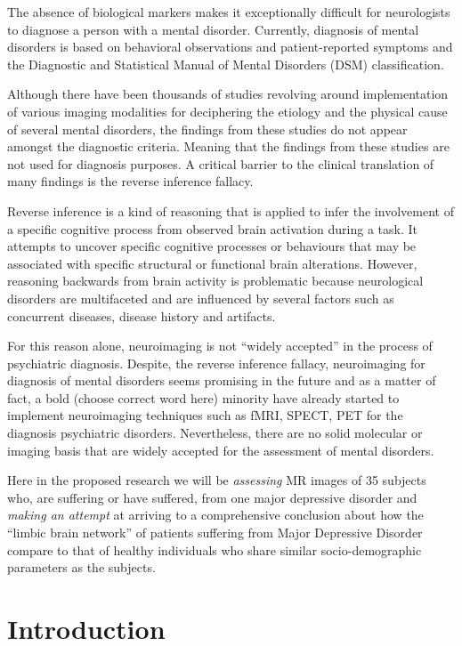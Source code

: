 \documentclass{article}
\begin{document}
  The absence of biological markers makes it exceptionally difficult
  for neurologists to diagnose a person with a mental disorder.
  Currently, diagnosis of mental disorders is based on behavioral
  observations and patient-reported symptoms and the Diagnostic and
  Statistical Manual of Mental Disorders (DSM) classification.

  Although there have been thousands of studies revolving around
  implementation of various imaging modalities for deciphering the
  etiology and the physical cause of several mental disorders, the
  findings from these studies do not appear amongst the diagnostic
  criteria. Meaning that the findings from these studies are not used
  for diagnosis purposes. A critical barrier to the clinical
  translation of many findings is the reverse inference fallacy.

  Reverse inference is a kind of reasoning that is applied to infer
  the involvement of a specific cognitive process from observed brain
  activation during a task.  It attempts to uncover specific cognitive
  processes or behaviours that may be associated with specific
  structural or functional brain alterations. However, reasoning
  backwards from brain activity is problematic because neurological
  disorders are multifaceted and are influenced by several factors
  such as concurrent diseases, disease history and artifacts.

  For this reason alone, neuroimaging is not ``widely accepted'' in
  the process of psychiatric diagnosis.  Despite, the reverse
  inference fallacy, neuroimaging for diagnosis of mental disorders
  seems promising in the future and as a matter of fact, a bold
  (choose correct word here) minority have already started to
  implement neuroimaging techniques such as fMRI, SPECT, PET for the
  diagnosis psychiatric disorders. Nevertheless, there are no solid
  molecular or imaging basis that are widely accepted for the
  assessment of mental disorders.

  Here in the proposed research we will be \textit{assessing} MR
  images of 35 subjects who, are suffering or have suffered, from one
  major depressive disorder and \textit{making an attempt} at arriving
  to a comprehensive conclusion about how the ``limbic brain network''
  of patients suffering from Major Depressive Disorder compare to that
  of healthy individuals who share similar socio-demographic
  parameters as the subjects.

\newpage
\section{Introduction}
\end{document}
